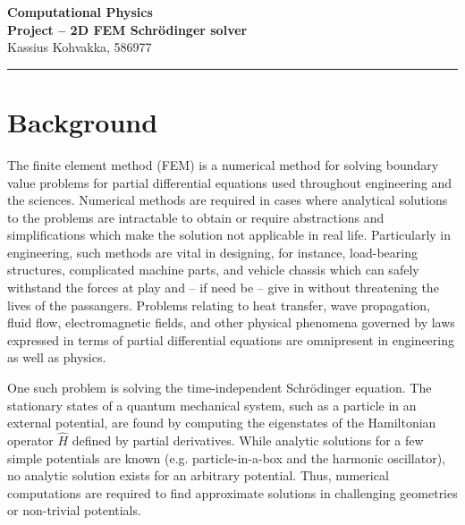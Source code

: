 \documentclass[a4paper,12pt]{article}
\newcommand{\exerline}{
\vspace*{.1cm}
\noindent \rule{\textwidth}{1pt}
\vspace*{.1cm}
}
\begin{document}
\begin{minipage}[t][1.5cm][b]{\textwidth}
\begin{center}
\Large{\textbf{Computational Physics}} \\
\vspace*{.1cm}
\Large{\textbf{Project -- 2D FEM Schrödinger solver}}\\
\vspace*{.1cm}
\large{Kassius Kohvakka, 586977}
\end{center}
\end{minipage} 
\vspace{-0.4cm}

\exerline
\vspace{-0.7cm}
\section{Background}

The finite element method (FEM) is a numerical method for solving boundary value problems for partial differential equations used throughout engineering and the sciences. Numerical methods are required in cases where analytical solutions to the problems are intractable to obtain or require abstractions and simplifications which make the solution not applicable in real life. Particularly in engineering, such methods are vital in designing, for instance, load-bearing structures, complicated machine parts, and vehicle chassis which can safely withstand the forces at play and -- if need be -- give in without threatening the lives of the passangers. Problems relating to heat transfer, wave propagation, fluid flow, electromagnetic fields, and other physical phenomena governed by laws expressed in terms of partial differential equations are omnipresent in engineering as well as physics.

One such problem is solving the time-independent Schrödinger equation. The stationary states of a quantum mechanical system, such as a particle in an external potential, are found by computing the eigenstates of the Hamiltonian operator $\hat{H}$ defined by partial derivatives. While analytic solutions for a few simple potentials are known (e.g. particle-in-a-box and the harmonic oscillator), no analytic solution exists for an arbitrary potential. Thus, numerical computations are required to find approximate solutions in challenging geometries or non-trivial potentials.
\end{document}
